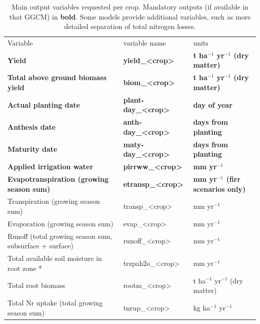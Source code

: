 \documentclass[gmd, manuscript]{copernicus} %
\begin{document}
\begin{table}[]
\caption{Main output variables requested per crop. Mandatory outputs (if available in that GGCM) in \textbf{bold}. Some models provide additional variables, such as more detailed separation of total nitrogen losses. }
\label{table:outputs}
\begin{tabular}{lll}
        \tophline \vspace{1mm}
Variable                                & variable name             & units \\
\middlehline \vspace{1mm}
\textbf{Yield}                                   & \textbf{yield\_<crop>}     & \textbf{t ha$^{-1}$ yr$^{-1}$ (dry matter)}\\
\textbf{Total above ground biomass yield}        & \textbf{biom\_<crop>}      & \textbf{t ha$^{-1}$ yr$^{-1}$ (dry matter)}\\
\textbf{Actual planting date}                    & \textbf{plant-day\_<crop>} & \textbf{day of year}\\
\textbf{Anthesis date}                           & \textbf{anth-day\_<crop>}  & \textbf{days from planting} \\
\textbf{Maturity date}                           & \textbf{maty-day\_<crop>}  & \textbf{days from planting}\\
\textbf{Applied irrigation water}                & \textbf{pirrww\_<crop>}    & \textbf{mm yr$^{-1}$} \\
\textbf{Evapotranspiration (growing season sum)} & \textbf{etransp\_<crop>}   & \textbf{mm yr$^{-1}$ (firr scenarios only)}\\ \middlehline
Transpiration (growing season sum)                       & transp\_<crop>    & mm yr$^{-1}$ \\
Evaporation (growing season sum)                         & evap\_<crop>      & mm yr$^{-1}$ \\
Runoff (total growing season sum, subsurface + surface)  & runoff\_<crop>    & mm yr$^{-1}$                    \\
Total available soil moisture in root zone *             & trzpah2o\_<crop>  & mm yr$^{-1}$                    \\
Total root biomass                                       & rootm\_<crop>     & t ha$^{-1}$ yr$^{-1}$ (dry matter)  \\
Total Nr uptake (total growing season sum)               & tnrup\_<crop>     & kg ha$^{-1}$ yr$^{-1}$              \\

\end{tabular}
\end{table}
\end{document}
